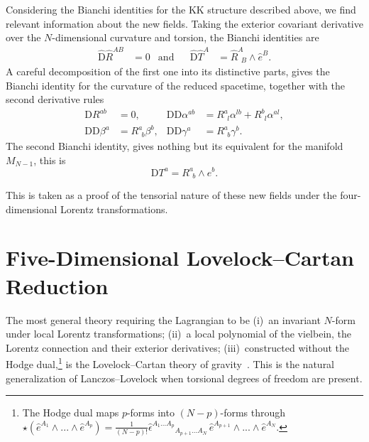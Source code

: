 \documentclass[aps,prd,12pt,superscriptaddress,showpacs,showkeys,longbibliography,reprint,nofootinbib]{revtex4-1}
\begin{document}
Considering the Bianchi identities for the KK structure described above, we find relevant information about the new fields. Taking the exterior covariant derivative over the $N$-dimensional curvature and torsion, the Bianchi identities are
\begin{align*}
  \hat{\text{D}}\hat{R}^{AB} &= 0 &\mbox{and}& &\hat{\text{D}}\hat{T}^A &= \hat{R}^A_{\ \ B}\wedge\hat{e}^B.
\end{align*}
A careful decomposition of the first one into its distinctive parts, gives the Bianchi identity for the curvature of the reduced spacetime, together with the second derivative rules
\begin{align*}
  \text{D}R^{ab} &=0, & \text{D}\mbox{D}\alpha^{ab} &=R^a_{\ \ l}\alpha^{lb}+R^b_{\ \ l}\alpha^{al},\\
  \text{D}\text{D}\beta^a &= R^a_{\ \ b}\beta^{b}, & \text{D}\text{D}\gamma^a &= R^a_{\ \ b}\gamma^{b}.
\end{align*}
The second Bianchi identity, gives nothing but its equivalent for the manifold $M_{N-1}$, this is
\begin{equation*}
  \mbox{D}T^a=R^a_{\ \ b}\wedge e^b.
\end{equation*}

This is taken as a proof of the tensorial nature of these new fields under the four-dimensional Lorentz transformations.

\section{Five-Dimensional Lovelock--Cartan Reduction\label{5EGB}}

The most general theory requiring the Lagrangian to be (i)~an invariant $N$-form under local Lorentz transformations; (ii)~a local polynomial of the vielbein, the Lorentz connection and their exterior derivatives; (iii)~constructed without the Hodge dual,\footnote{The Hodge dual maps $p$-forms into $(N-p)$-forms through $\star\left(\hat{e}^{A_1}\wedge ... \wedge\hat{e}^{A_p}\right) = \frac{1}{(N-p)!}\hat{\epsilon}^{A_1\ldots A_p}{}_{A_{p+1}...A_N}\,\hat{e}^{A_{p+1}}\wedge ... \wedge\hat{e}^{A_N}$.} is the Lovelock--Cartan theory of gravity~\cite{Mardones:1990qc}. This is the natural generalization of Lanczos--Lovelock when torsional degrees of freedom are present. 
\end{document}
